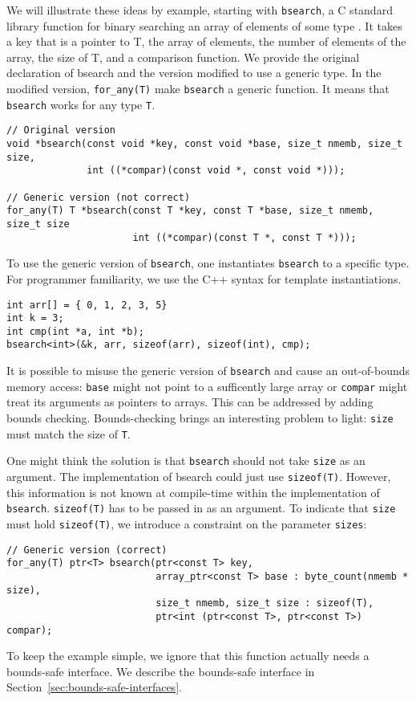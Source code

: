 We will illustrate these ideas by example, starting with \lstinline+bsearch+, 
a C standard library function for binary
searching an array of elements of some type .  It
takes a key that is a pointer to T, the array of elements, the number of elements of
the array, the size of T, and a comparison function.  We provide the original declaration
of bsearch and the version modified to use a generic type.  In the modified version,
\lstinline+for_any(T)+ make \lstinline+bsearch+ a generic function.  It means that
\lstinline+bsearch+ works for  any type \lstinline+T+.
\begin{lstlisting}
// Original version
void *bsearch(const void *key, const void *base, size_t nmemb, size_t size,
              int ((*compar)(const void *, const void *)));

// Generic version (not correct)
for_any(T) T *bsearch(const T *key, const T *base, size_t nmemb, size_t size
                      int ((*compar)(const T *, const T *)));
\end{lstlisting}
To use the generic version of \lstinline+bsearch+, one instantiates \lstinline+bsearch+ to
a specific type.  For programmer familiarity, we use the C++ syntax for template
instantiations.
\begin{lstlisting}
int arr[] = { 0, 1, 2, 3, 5}
int k = 3;
int cmp(int *a, int *b);
bsearch<int>(&k, arr, sizeof(arr), sizeof(int), cmp);
\end{lstlisting}

It is possible to misuse the generic version of \lstinline+bsearch+ and cause
an out-of-bounds memory access: \lstinline+base+ might not point to a sufficently
large array or \lstinline+compar+ might treat its arguments as pointers to arrays.
This can be addressed by adding bounds checking.  Bounds-checking brings
an interesting problem to light: \lstinline+size+  must match the size of \lstinline+T+.

One might think the solution is that \lstinline+bsearch+ should not take 
\lstinline+size+ as an argument.  The implementation of bsearch could just 
use \lstinline+sizeof(T)+. However, this information is not known at compile-time
within the implementation of \lstinline+bsearch+.   \lstinline+sizeof(T)+
has to be passed in as an argument.  To indicate that \lstinline+size+ must
hold \lstinline+sizeof(T)+, we introduce a constraint on the parameter \lstinline+sizes+:
\begin{lstlisting}
// Generic version (correct)
for_any(T) ptr<T> bsearch(ptr<const T> key,
                          array_ptr<const T> base : byte_count(nmemb * size),
                          size_t nmemb, size_t size : sizeof(T),
                          ptr<int (ptr<const T>, ptr<const T>) compar);
\end{lstlisting}
To keep the example simple, we ignore that this function actually needs a 
bounds-safe interface.  We describe the bounds-safe interface in 
Section~\ref{sec:bounds-safe-interfaces}.

